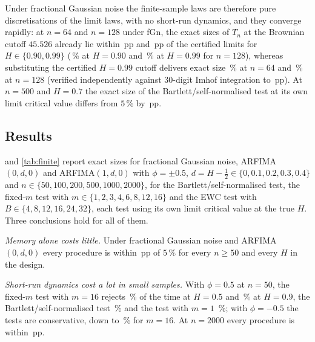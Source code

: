 
Under fractional Gaussian noise the finite-sample laws are therefore pure discretisations of the limit laws, with no
short-run dynamics, and they converge rapidly: at $n=64$ and $n=128$ under fGn, the exact sizes of $T_n$ at the Brownian
cutoff $45.526$ already lie within \,pp and \,pp of the certified limits
for $H\in\{0.90,0.99\}$ (\,\% at $H=0.90$ and \,\% at $H=0.99$ for $n=128$),
whereas substituting the certified $H=0.99$ cutoff  delivers exact size \,\% at
$n=64$ and \,\% at $n=128$ (verified independently against $30$-digit Imhof integration to
\,pp). At $n=500$ and $H=0.7$ the exact size of the Bartlett/self-normalised test at its own limit
critical value differs from $5\,\%$ by \,pp.

\subsection{Results}
 and \cref{tab:finite} report exact sizes for fractional Gaussian noise, ARFIMA$(0,d,0)$ and
ARFIMA$(1,d,0)$ with $\phi=\pm0.5$, $d=H-\frac12\in\{0,\allowbreak0.1,\allowbreak0.2,\allowbreak0.3,\allowbreak0.4\}$ and $n\in\{50,\allowbreak100,\allowbreak200,\allowbreak500,\allowbreak1000,\allowbreak2000\}$,
for the Bartlett/self-normalised test, the fixed-$m$ test with $m\in\{1,2,3,4,6,8,12,16\}$ and the EWC test with
$B\in\{4,8,12,16,24,32\}$, each test using its own limit critical value at the true $H$. Three conclusions hold for all of them.

\emph{Memory alone costs little.} Under fractional Gaussian noise and ARFIMA$(0,d,0)$ every procedure is within
\,pp of $5\,\%$ for every $n\ge50$ and every $H$ in the design.

\emph{Short-run dynamics cost a lot in small samples.} With $\phi=0.5$ at $n=50$, the fixed-$m$ test with $m=16$
rejects \,\% of the time at $H=0.5$ and \,\% at
$H=0.9$, the Bartlett/self-normalised test \,\% and the test with $m=1$
\,\%; with $\phi=-0.5$ the tests are conservative, down to
\,\% for $m=16$. At $n=2000$ every procedure is within \,pp.

